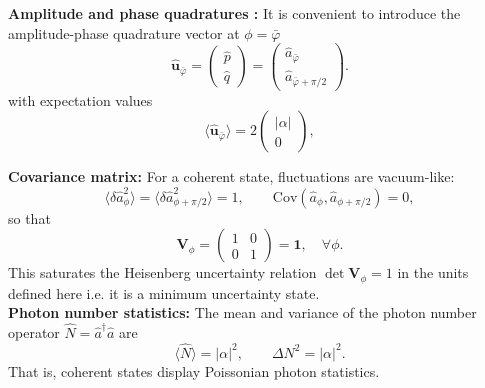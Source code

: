 \noindent \textbf{Amplitude and phase quadratures :} It is convenient to introduce the amplitude-phase quadrature vector at $\phi = \bar{\varphi}$
\begin{equation}
\mathbf{\hat{\mathbf u}} _{\bar{\varphi}} =
\begin{pmatrix}
\hat{p} \\[2pt]
\hat{q}
\end{pmatrix}
=
\begin{pmatrix}
\hat{a}_{\bar{\varphi}} \\[2pt]
\hat{a}_{\bar{\varphi}+\pi/2}
\end{pmatrix}.
\end{equation}
with expectation values
\begin{equation}
\langle \mathbf{\hat{\mathbf u}} _{\bar{\varphi}} \rangle
=
2\begin{pmatrix}
|\alpha| \\[2pt]
0
\end{pmatrix},
\end{equation}



\noindent \textbf{Covariance matrix: } For a coherent state, fluctuations are vacuum-like:
\begin{equation}
\langle \delta \hat{a}_\phi^2 \rangle = \langle \delta \hat{a}_{\phi+\pi/2}^2 \rangle = 1,
\qquad
\mathrm{Cov}(\hat{a}_\phi,\hat{a}_{\phi+\pi/2}) = 0,
\end{equation}
so that
\begin{equation}
\mathbf V_\phi =
\begin{pmatrix}
1 & 0\\
0 & 1
\end{pmatrix}
= \mathbf{1},
\quad \forall \phi .
\label{II.CS.3}
\end{equation}
This saturates the Heisenberg uncertainty relation $\det \mathbf V_\phi = 1$ in the units defined here i.e. it is a minimum uncertainty state. \\

\noindent \textbf{Photon number statistics:} The mean and variance of the photon number operator $\hat{N}=\hat{a}^\dagger\hat{a}$ are
\begin{equation}
\langle \hat{N} \rangle = |\alpha|^2,
\qquad
\Delta N^2 = |\alpha|^2.
\label{II.19}
\end{equation}
That is, coherent states display Poissonian photon statistics.


